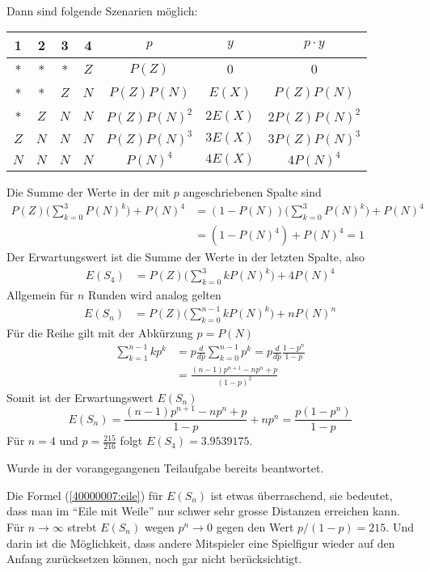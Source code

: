 \begin{loesung}
\begin{teilaufgaben}
\begin{align*}
\end{align*}
Dann sind folgende Szenarien möglich:
\begin{center}
\begin{tabular}{|cccc|c|c|c|}
\hline
1&2&3&4&$p$&$y$&$p\cdot y$\\
\hline
 * & * & * &$Z$&$P(Z)$&$0$&$0$\\
 * & * &$Z$&$N$&$P(Z)P(N)$&$E(X)$&$P(Z)P(N)$\\
 * &$Z$&$N$&$N$&$P(Z)P(N)^2$&$2E(X)$&$2P(Z)P(N)^2$\\
$Z$&$N$&$N$&$N$&$P(Z)P(N)^3$&$3E(X)$&$3P(Z)P(N)^3$\\
$N$&$N$&$N$&$N$&$P(N)^4$&$4E(X)$&$4    P(N)^4$\\
\hline
\end{tabular}
\end{center}
Die Summe der Werte in der mit $p$ angeschriebenen Spalte sind
\begin{align*}
P(Z)\biggl(\sum_{k=0}^3 P(N)^k\biggr) + P(N)^4
&=
(1-P(N))\biggl(\sum_{k=0}^3 P(N)^k\biggr) + P(N)^4\\
&=
(1-P(N)^4) + P(N)^4
=1
\end{align*}
Der Erwartungswert ist die Summe der Werte in der letzten
Spalte, also
\begin{align*}
E(S_4)
&=
P(Z)\biggl(\sum_{k=0}^3kP(N)^k\biggr)+4P(N)^4
\end{align*}
Allgemein für $n$ Runden wird analog gelten
\begin{align*}
E(S_n)&=P(Z)\biggl(\sum_{k=0}^{n-1} kP(N)^k\biggr) + nP(N)^n
\end{align*}
Für die Reihe gilt mit der Abkürzung $p=P(N)$
\begin{align*}
\sum_{k=1}^{n-1}kp^k
&=p\frac{d}{dp}\sum_{k=0}^{n-1}p^k
 =p\frac{d}{dp}\frac{1-p^n}{1-p}\\
&= \frac{(n-1) p^{n+1}-n p^n+p}{(1-p)^2}
\end{align*}
Somit ist der Erwartungswert $E(S_n)$
\begin{equation}
E(S_n)
=
\frac{(n-1) p^{n+1}-n p^n+p}{1-p}+np^n
=\frac{p(1-p^n)}{1-p}
\label{40000007:eile}
\end{equation}
Für $n=4$ und $p=\frac{215}{216}$ folgt
$
E(S_4)=
3.9539175
$.
\item Wurde in der vorangegangenen Teilaufgabe bereits
beantwortet.
\end{teilaufgaben}
Die Formel (\ref{40000007:eile}) für $E(S_n)$ ist etwas überraschend,
sie bedeutet,
dass man im ``Eile mit Weile'' nur schwer sehr grosse Distanzen
erreichen kann. Für $n\to\infty$ strebt $E(S_n)$
wegen $p^n\to 0$ gegen den Wert $p/(1-p)=215$.  Und darin ist die
Möglichkeit, dass andere Mitspieler eine Spielfigur wieder auf den
Anfang zurücksetzen können, noch gar nicht berücksichtigt.
\end{loesung}

